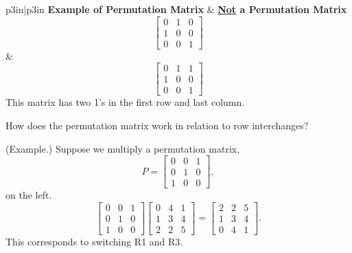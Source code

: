 \documentclass[letterpaper]{article}
\newcommand{\0}{\mathbf{0}}
\begin{document}
\begin{center}
    \begin{tabular}{p{3in}|p{3in}}
        \textbf{Example of Permutation Matrix} & \textbf{\underline{Not} a Permutation Matrix} \\ 
        \hline 
        \[\begin{bmatrix}
            0 & 1 & 0 \\ 
            1 & 0 & 0 \\ 
            0 & 0 & 1 
        \end{bmatrix}\] & \[\begin{bmatrix}
            0 & 1 & 1 \\ 
            1 & 0 & 0 \\ 
            0 & 0 & 1
        \end{bmatrix}\]
        This matrix has two 1's in the first row and last column.
    \end{tabular}
\end{center}
How does the permutation matrix work in relation to row interchanges?

\begin{mdframed}[nobreak=true]
    (Example.) Suppose we multiply a permutation matrix, 
    \[P = \begin{bmatrix}
        0 & 0 & 1 \\ 
        0 & 1 & 0 \\ 
        1 & 0 & 0
    \end{bmatrix},\]
    on the left. 
    \[\begin{bmatrix}
        0 & 0 & 1 \\ 
        0 & 1 & 0 \\ 
        1 & 0 & 0
    \end{bmatrix} \begin{bmatrix}
        0 & 4 & 1 \\ 
        1 & 3 & 4 \\ 
        2 & 2 & 5
    \end{bmatrix} = \begin{bmatrix}
        2 & 2 & 5 \\ 
        1 & 3 & 4 \\ 
        0 & 4 & 1
    \end{bmatrix}.\]
    This corresponds to switching R1 and R3. 
\end{mdframed}
\end{document}
